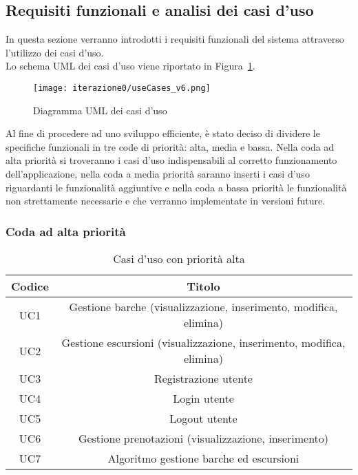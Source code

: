 \subsection{Requisiti funzionali e analisi dei casi d'uso}

In questa sezione verranno introdotti i requisiti funzionali del sistema attraverso l'utilizzo dei casi d'uso.
\\Lo schema UML dei casi d'uso viene riportato in Figura~\ref{fig:casiduso}.

\begin{figure}[htbp]
    \texttt{[image: iterazione0/useCases\_v6.png]}
    \centering
    \caption{Diagramma UML dei casi d'uso}\label{fig:casiduso}
\end{figure}

Al fine di procedere ad uno sviluppo efficiente, è stato deciso di dividere le specifiche funzionali in tre code di priorità: alta, media e bassa. Nella coda ad alta priorità si troveranno i casi d'uso indispensabili al corretto funzionamento dell'applicazione, nella coda a media priorità saranno inserti i casi d'uso riguardanti le funzionalità aggiuntive e nella coda a bassa priorità le funzionalità non strettamente necessarie e che verranno implementate in versioni future.

\clearpage
\subsubsection{Coda ad alta priorità}

\begin{table}[htbp]
 \centering
 \begin{tabular}{|c | c|} 
 \hline
 Codice & Titolo \\ [0.5ex] 
 \hline\hline
UC1 & Gestione barche (visualizzazione, inserimento, modifica, elimina) \\
\hline
UC2 & Gestione escursioni (visualizzazione, inserimento, modifica, elimina) \\
\hline
UC3 & Registrazione utente \\
\hline
UC4 & Login utente \\
\hline
UC5 & Logout utente \\
\hline
UC6 & Gestione prenotazioni (visualizzazione, inserimento) \\
\hline
UC7 & Algoritmo gestione barche ed escursioni \\
\hline
\end{tabular}
\caption{Casi d'uso con priorità alta}
\label{Casi d'uso con priorità alta}
\end{table}


